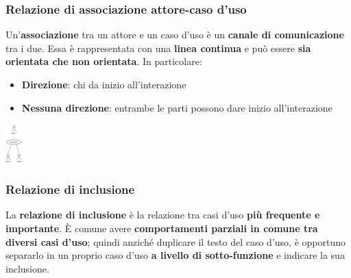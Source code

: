 \documentclass[12pt]{article}
\begin{document}
\subsubsection{Relazione di associazione attore-caso d'uso}
Un'\textbf{associazione} tra un attore e un caso d'uso è un \textbf{canale di comunicazione} tra i due.
Essa è rappresentata con una \textbf{linea continua} e può essere \textbf{sia orientata che non orientata}.
In particolare:
\begin{itemize}
    \item \textbf{Direzione}: chi da inizio all'interazione
    \item \textbf{Nessuna direzione}: entrambe le parti possono dare inizio all'interazione
\end{itemize}
\begin{center}
    \includegraphics[width = 0.05\textwidth]{Images/41.png}
\end{center}
\subsubsection{Relazione di inclusione}
La \textbf{relazione di inclusione} è la relazione tra casi d'uso \textbf{più frequente e importante}.
È comune avere \textbf{comportamenti parziali in comune tra diversi casi d'uso}; quindi anziché duplicare il testo del caso d'uso, è opportuno separarlo in un proprio caso d'uso \textbf{a livello di sotto-funzione} e indicare la sua inclusione.
\end{document}

